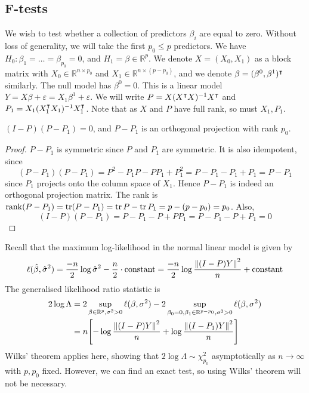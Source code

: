 \subsection{F-tests}
We wish to test whether a collection of predictors \( \beta_i \) are equal to zero.
Without loss of generality, we will take the first \( p_0 \leq p \) predictors.
We have \( H_0 \colon \beta_1 = \dots = \beta_{p_0} = 0 \), and \( H_1 = \beta \in \mathbb R^p \).
We denote \( X = (X_0, X_1) \) as a block matrix with \( X_0 \in \mathbb R^{n \times p_0} \) and \( X_1 \in \mathbb R^{n \times (p-p_0)} \), and we denote \( \beta = (\beta^0, \beta^1)^\intercal \) similarly.
The null model has \( \beta^0 = 0 \).
This is a linear model \( Y = X\beta + \varepsilon = X_1 \beta^1 + \varepsilon \).
We will write \( P = X(X^\intercal X)^{-1} X^\intercal \) and \( P_1 = X_1 (X_1^\intercal X_1)^{-1} X_1^\intercal \).
Note that as \( X \) and \( P \) have full rank, so must \( X_1, P_1 \).
\begin{lemma}
	\( (I-P)(P - P_1) = 0 \), and \( P - P_1 \) is an orthogonal projection with rank \( p_0 \).
\end{lemma}
\begin{proof}
	\( P - P_1 \) is symmetric since \( P \) and \( P_1 \) are symmetric.
	It is also idempotent, since
	\[ (P-P_1)(P-P_1) = P^2 - P_1 P - P P_1 + P_1^2 = P - P_1 - P_1 + P_1 = P - P_1 \]
	since \( P_1 \) projects onto the column space of \( X_1 \).
	Hence \( P - P_1 \) is indeed an orthogonal projection matrix.
	The rank is \( \rank(P - P_1) = \tr(P - P_1) = \tr P - \tr P_1 = p - (p - p_0) = p_0 \).
	Also,
	\[ (I-P)(P-P_1) = P-P_1 - P + PP_1 = P-P_1 - P + P_1 = 0 \]
\end{proof}
Recall that the maximum log-likelihood in the normal linear model is given by
\[ \ell(\hat \beta, \hat \sigma^2) = \frac{-n}{2} \log \hat\sigma^2 - \frac{n}{2} \cdot \text{constant} = \frac{-n}{2} \log \frac{\norm{(I-P)Y}^2}{n} + \text{constant} \]
The generalised likelihood ratio statistic is
\begin{align*}
	2 \log \Lambda &= 2 \sup_{\beta \in \mathbb R^p,\sigma^2>0} \ell(\beta, \sigma^2) - 2 \sup_{\beta_0 = 0, \beta_1 \in \mathbb R^{p-p_0},\sigma^2>0} \ell(\beta, \sigma^2) \\
	&= n \qty[ -\log \frac{\norm{(I-P)Y}^2}{n} + \log \frac{\norm{(I-P_1)Y}^2}{n} ]
\end{align*}
Wilks' theorem applies here, showing that \( 2 \log \Lambda \sim \chi^2_{p_0} \) asymptotically as \( n \to \infty \) with \( p, p_0 \) fixed.
However, we can find an exact test, so using Wilks' theorem will not be necessary.
